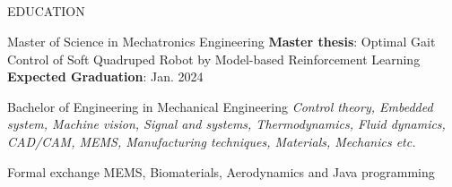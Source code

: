 \documentclass{my_cv}
\begin{document}
\begin{multicols}{2}

\section{\faGraduationCap}{EDUCATION}

{Master of Science in Mechatronics Engineering}
\textbf{Master thesis}: Optimal Gait Control of Soft Quadruped Robot by Model-based Reinforcement Learning \\
\textbf{Expected Graduation}: Jan. 2024
    
{Bachelor of Engineering in Mechanical Engineering} %
{\textit{Control theory, Embedded system, Machine vision, Signal and systems, Thermodynamics, Fluid dynamics, CAD/CAM, MEMS, Manufacturing techniques, Materials, Mechanics etc.}}

{Formal exchange} %
{MEMS, Biomaterials, Aerodynamics and Java programming}


\end{multicols}
\end{document}
